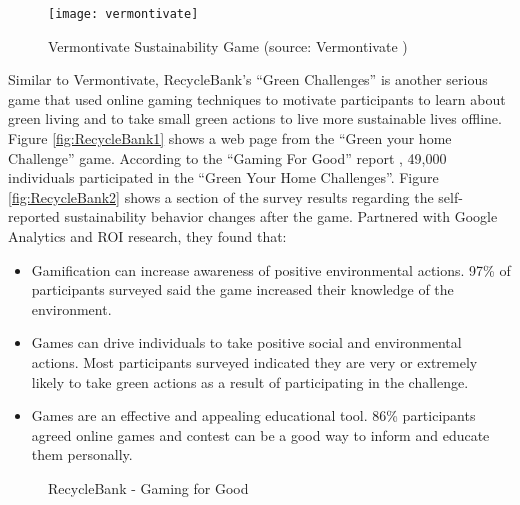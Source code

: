 \begin{figure}[ht!]
	\centering
		\texttt{[image: vermontivate]}
		\caption{Vermontivate Sustainability Game (source: Vermontivate \cite{vermontivate})}
		\label{fig:vermontivate}
\end{figure}

Similar to Vermontivate, RecycleBank's ``Green Challenges'' \cite {recyclebank} is another serious game that used online gaming techniques to motivate participants to learn about green living and to take small green actions to live more sustainable lives offline. Figure \autoref{fig:RecycleBank1} shows a web page from the ``Green your home Challenge'' game. According to the ``Gaming For Good'' report \cite {gamingforgood}, 49,000 individuals participated in the ``Green Your Home Challenges''. Figure \autoref{fig:RecycleBank2} shows a section of the survey results regarding the self-reported sustainability behavior changes after the game. Partnered with Google Analytics and ROI research, they found that:
\begin{itemize}
	\item Gamification can increase awareness of positive environmental actions. 97\% of participants surveyed said the game increased their knowledge of the environment.
	\item Games can drive individuals to take positive social and environmental actions. Most participants surveyed indicated they are very or extremely likely to take green actions as a result of participating in the challenge.
	\item Games are an effective and appealing educational tool. 86\% participants agreed online games and contest can be a good way to inform and educate them personally.
\end{itemize}

\begin{figure}[ht!]
	\centering
		\caption{RecycleBank - Gaming for Good}
		\label{fig:recyclebank}
\end{figure}

